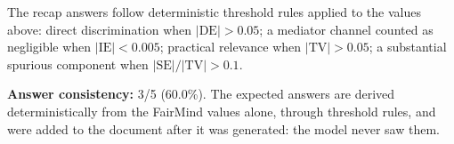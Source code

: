 \documentclass[11pt]{article}
\begin{document}
\vspace{1em}
\noindent\footnotesize
The recap answers follow deterministic threshold rules applied to the values above: direct discrimination when $|\mathrm{DE}| > 0.05$; a mediator channel counted as negligible when $|\mathrm{IE}| < 0.005$; practical relevance when $|\mathrm{TV}| > 0.05$; a substantial spurious component when $|\mathrm{SE}| / |\mathrm{TV}| > 0.1$.


\vspace{1em}
\noindent\textbf{Answer consistency:} 3/5 (60.0\%). The expected answers are derived deterministically from the FairMind values alone, through threshold rules, and were added to the document after it was generated: the model never saw them.
\end{document}
